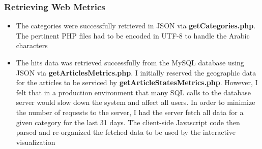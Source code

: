 \documentclass[12pt]{article}
\begin{document}
\subsubsection{Retrieving Web Metrics}
\begin{itemize}
\item The categories were successfully retrieved in JSON via \textbf{getCategories.php}. The pertinent PHP files had to be encoded in UTF-8 to handle the Arabic characters
\item The hits data was retrieved successfully from the MySQL database using JSON via \textbf{getArticlesMetrics.php}. I initially reserved the geographic data for the articles to be serviced by \textbf{getArticleStatesMetrics.php}. However, I felt that in a production environment that many SQL calls to the database server would slow down the system and affect all users. In order to minimize the number of requests to the server, I had the server fetch all data for a given category for the last 31 days. The client-side Javascript code then parsed and re-organized the fetched data to be used by the interactive visualization
\end{itemize}
\end{document}
